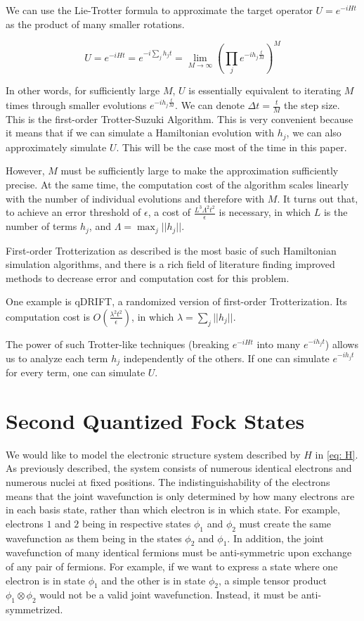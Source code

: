 We can use the Lie-Trotter formula to approximate the target operator $U = e^{-iHt}$ as the product of many smaller rotations.

\begin{equation}
    U = e^{-iHt} = e^{-i\sum_j h_jt} = \lim_{M \rightarrow \infty} (\prod_j e^{-ih_j\frac{t}{M}})^M
\end{equation}

In other words, for sufficiently large $M$, $U$ is essentially equivalent to iterating $M$ times through smaller evolutions $e^{-ih_j\frac{t}{M}}$. We can denote $\Delta t = \frac{t}{M}$ the step size. This is the first-order Trotter-Suzuki Algorithm. This is very convenient because it means that if we can simulate a Hamiltonian evolution with $h_j$, we can also approximately simulate $U$. This will be the case most of the time in this paper.

However, $M$ must be sufficiently large to make the approximation sufficiently precise. At the same time, the computation cost of the algorithm scales linearly with the number of individual evolutions and therefore with $M$. It turns out that, to achieve an error threshold of $\epsilon$, a cost of $\frac{L^3\Lambda^2t^2}{\epsilon}$ is necessary, in which $L$ is the number of terms $h_j$, and $\Lambda = \max_j ||h_j||$.

First-order Trotterization as described is the most basic of such Hamiltonian simulation algorithms, and there is a rich field of literature finding improved methods to decrease error and computation cost for this problem.

One example is qDRIFT, a randomized version of first-order Trotterization. Its computation cost is $O(\frac{\lambda^2 t^2}{\epsilon})$, in which $\lambda = \sum_j ||h_j||$.

The power of such Trotter-like techniques (breaking $e^{-iHt}$ into many $e^{-ih_jt}$) allows us to analyze each term $h_j$ independently of the others. If one can simulate $e^{-ih_jt}$ for every term, one can simulate $U$.

\section{Second Quantized Fock States}

We would like to model the electronic structure system described by $H$ in \eqref{eq: H}. As previously described, the system consists of numerous identical electrons and numerous nuclei at fixed positions. The indistinguishability of the electrons means that the joint wavefunction is only determined by how many electrons are in each basis state, rather than which electron is in which state. For example, electrons $1$ and $2$ being in respective states $\phi_1$ and $\phi_2$ must create the same wavefunction as them being in the states $\phi_2$ and $\phi_1$. In addition, the joint wavefunction of many identical fermions must be anti-symmetric upon exchange of any pair of fermions. For example, if we want to express a state where one electron is in state $\phi_1$ and the other is in state $\phi_2$, a simple tensor product $\phi_1 \otimes \phi_2$ would not be a valid joint wavefunction. Instead, it must be anti-symmetrized.

